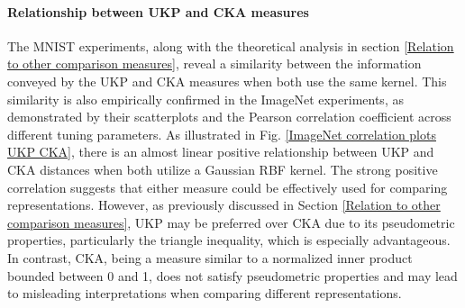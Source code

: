 \documentclass[11pt]{article}
\newcommand{\metricstname}{UKP }
\theoremstyle{plain}
\begin{document}
\paragraph{Relationship between UKP and CKA measures}

The MNIST experiments, along with the theoretical analysis in section \ref{Relation to other comparison measures}, reveal a similarity between the information conveyed by the \metricstname and CKA measures when both use the same kernel. This similarity is also empirically confirmed in the ImageNet experiments, as demonstrated by their scatterplots and the Pearson correlation coefficient across different tuning parameters. As illustrated in Fig. \ref{ImageNet correlation plots UKP CKA}, there is an almost linear positive relationship between \metricstname and CKA distances when both utilize a Gaussian RBF kernel. The strong positive correlation suggests that either measure could be effectively used for comparing representations. However, as previously discussed in Section \ref{Relation to other comparison measures}, \metricstname may be preferred over CKA due to its pseudometric properties, particularly the triangle inequality, which is especially advantageous. In contrast, CKA, being a measure similar to a normalized inner product bounded between 0 and 1, does not satisfy pseudometric properties and may lead to misleading interpretations when comparing different representations.
\end{document}
